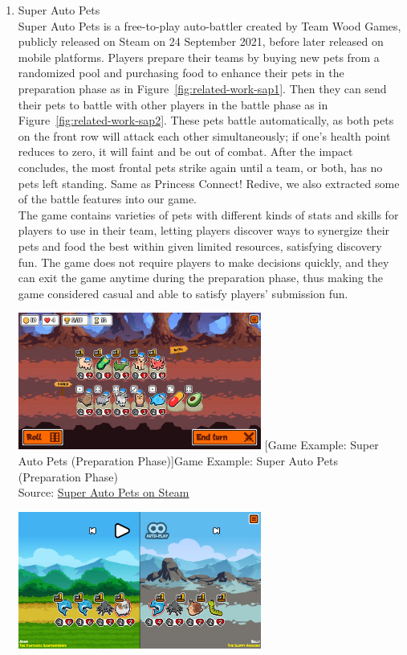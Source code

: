\documentclass[12pt,oneside,openright,a4paper]{cpe-english-project}
\begin{document}
\begin{enumerate}
	\item Super Auto Pets \\
	Super Auto Pets is a free-to-play auto-battler created by Team Wood Games, publicly released on Steam on 24 September 2021, before later released on mobile platforms. Players prepare their teams by buying new pets from a randomized pool and purchasing food to enhance their pets in the preparation phase as in Figure~\ref{fig:related-work-sap1}. Then they can send their pets to battle with other players in the battle phase as in Figure~\ref{fig:related-work-sap2}. These pets battle automatically, as both pets on the front row will attack each other simultaneously; if one's health point reduces to zero, it will faint and be out of combat. After the impact concludes, the most frontal pets strike again until a team, or both, has no pets left standing. Same as Princess Connect! Redive, we also extracted some of the battle features into our game. \\
	The game contains varieties of pets with different kinds of stats and skills for players to use in their team, letting players discover ways to synergize their pets and food the best within given limited resources, satisfying discovery fun. The game does not require players to make decisions quickly, and they can exit the game anytime during the preparation phase, thus making the game considered casual and able to satisfy players' submission fun. \\
	\begin{minipage}[c]{\textwidth}\centering
	\includegraphics[width=8cm]{figure/related-work-sap1.png}
	[Game Example: Super Auto Pets (Preparation Phase)]{Game Example: Super Auto Pets (Preparation Phase) 
		\\ Source: \href{https://store.steampowered.com/app/1714040/Super_Auto_Pets/}{Super Auto Pets on Steam}}
	\label{fig:related-work-sap1}
	\end{minipage}
	\begin{minipage}[c]{\textwidth}\centering
	\includegraphics[width=8cm]{figure/related-work-sap2.png}

\end{minipage}
\end{enumerate}
\end{document}
